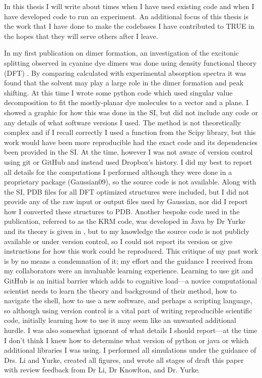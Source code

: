 In this thesis I will write about times when I have used existing code and when I have developed code to run an experiment.
An additional focus of this thesis is the work that I have done to make the codebases I have contributed to TRUE in the hopes that they will serve others after I leave.

In my first publication on dimer formation, an investigation of the excitonic splitting observed in cyanine dye dimers was done using density functional theory (DFT) \cite{Fothergill2018}.
By comparing calculated with experimental absorption spectra it was found that the solvent may play a large role in the dimer formation and peak shifting.
At this time I wrote some python code which used singular value decomposition to fit the mostly-planar dye molecules to a vector and a plane. 
I showed a graphic for how this was done in the SI, but did not include any code or any details of what software versions I used. 
The method is not theoretically complex and if I recall correctly I used a function from the Scipy library, but this work would have been more reproducible had the exact code and its dependencies been provided in the SI.
At the time, however I was not aware of version control using git or GitHub and instead used Dropbox's history.
I did my best to report all details for the computations I performed although they were done in a proprietary package (Gaussian09), so the source code is not available.
Along with the SI, PDB files for all DFT optimized structures were included, but I did not provide any of the raw input or output files used by Gaussian, nor did I report how I converted these structures to PDB.
Another bespoke code used in the publication, referred to as the KRM code, was developed in Java by Dr Yurke and its theory is given in \citet[Supporting Information]{Cannon2017}, but to my knowledge the source code is not publicly available or under version control, so I could not report its version or give instructions for how this work could be reproduced.
This critique of my past work is by no means a condemnation of it; my effort and the guidance I received from my collaborators were an invaluable learning experience.
Learning to use git and GitHub is an initial barrier which adds to cognitive load---a novice computational scientist needs to learn the theory and background of their method, how to navigate the shell, how to use a new software, and perhaps a scripting language, so although using version control is a vital part of writing reproducible scientific code, initially learning how to use it may seem like an unwanted additional hurdle.
I was also somewhat ignorant of what details I should report---at the time I don't think I knew how to determine what version of python or java or which additional libraries I was using.
I performed all simulations under the guidance of Drs. Li and Yurke, created all figures, and wrote all stages of draft this paper with review feedback from Dr Li, Dr Knowlton, and Dr. Yurke.

